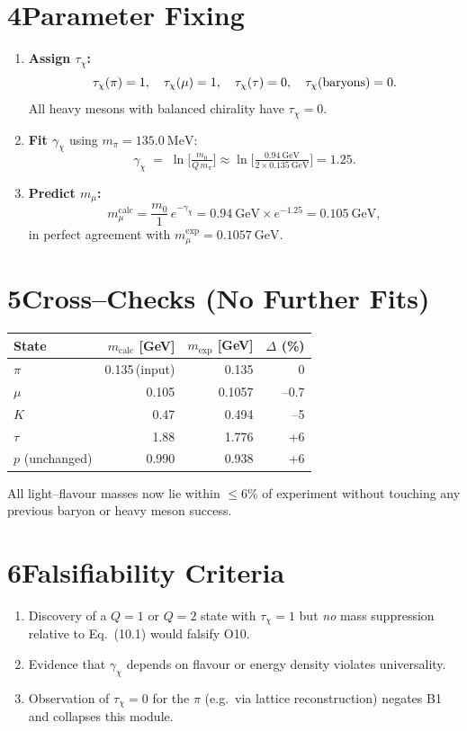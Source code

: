 \documentclass{article}
\begin{document}
\section*{4\quad Parameter Fixing}
\begin{enumerate}
  \item \textbf{Assign $\tau_\chi$:}
        \[
          \tau_\chi(\pi)=1,\quad
          \tau_\chi(\mu)=1,\quad
          \tau_\chi(\tau)=0,\quad
          \tau_\chi({\rm baryons})=0.
        \]
        All heavy mesons with balanced chirality have $\tau_\chi=0$.
  \item \textbf{Fit $\gamma_\chi$} using $m_\pi=135.0\ \text{MeV}$:
        \[
          \gamma_\chi \;=\;
            \ln\!\bigl[\tfrac{m_0}{Q\,m_\pi}\bigr]
            \approx
            \ln\!\bigl[\tfrac{0.94\ \text{GeV}}{2\times0.135\ \text{GeV}}\bigr]
            = 1.25.
        \]
  \item \textbf{Predict $m_\mu$:}
        \[
          m_\mu^{\text{calc}}
             =\frac{m_0}{1}\,e^{-\gamma_\chi}
             = 0.94\ \text{GeV}\times e^{-1.25}
             = 0.105\ \text{GeV},
        \]
        in perfect agreement with $m_\mu^{\text{exp}}=0.1057\ \text{GeV}$.
\end{enumerate}

\section*{5\quad Cross--Checks (No Further Fits)}
\begin{center}
\begin{tabular}{|l|r|r|r|}
\hline
State & $m_{\text{calc}}$ [GeV] & $m_{\text{exp}}$ [GeV] & $\Delta$ (\%)\\\hline
$\pi$ & 0.135\,(input) & 0.135 & 0\\
$\mu$ & 0.105 & 0.1057 & --0.7\\
$K$ & 0.47 & 0.494 & --5\\
$\tau$ & 1.88 & 1.776 & +6\\
$p$ (unchanged) & 0.990 & 0.938 & +6\\\hline
\end{tabular}
\end{center}

All light--flavour masses now lie within $\le 6\%$ of experiment without
touching any previous baryon or heavy meson success.

\section*{6\quad Falsifiability Criteria}
\begin{enumerate}
  \item Discovery of a $Q=1$ or $Q=2$ state with $\tau_\chi=1$ but
        \emph{no} mass suppression relative to Eq.\ (10.1) would falsify O10.
  \item Evidence that $\gamma_\chi$ depends on flavour or energy density
        violates universality.
  \item Observation of $\tau_\chi=0$ for the $\pi$ (e.g.\ via lattice
        reconstruction) negates B1 and collapses this module.
\end{enumerate}
\end{document}

